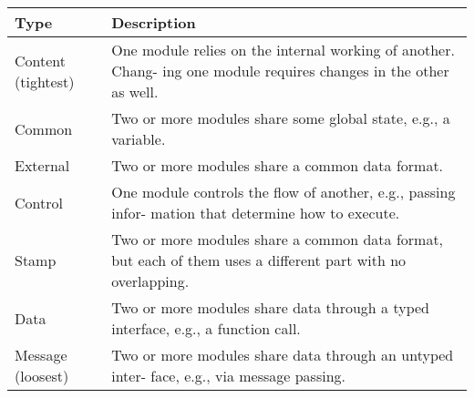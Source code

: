 \centering
\begin{tabular}{|l|p{2.5in}|}
\hline
\bfseries Type & \bfseries Description\\
\hline
Content (tightest) & One module relies on the internal working of another. Chang- ing one module requires changes in the other as well.\\
\hline
Common & Two or more modules share some global state, e.g., a variable.\\
\hline
External & Two or more modules share a common data format.\\
\hline
Control & One module controls the flow of another, e.g., passing infor- mation that determine how to execute.\\
\hline
Stamp & Two or more modules share a common data format, but each of them uses a different part with no overlapping.\\
\hline
Data & Two or more modules share data through a typed interface, e.g., a function call.\\
\hline
Message (loosest) & Two or more modules share data through an untyped inter- face, e.g., via message passing.\\
\hline
\end{tabular}